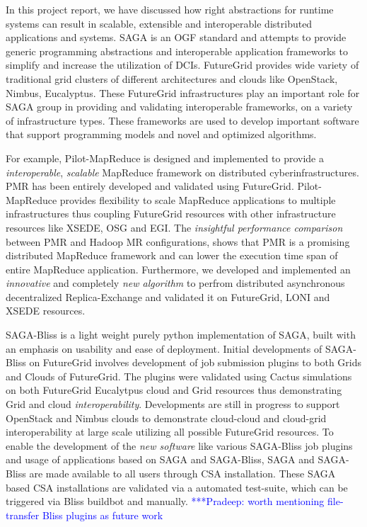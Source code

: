 \documentclass[]{paper}
\newcommand{\pmnote}[1]{ {\textcolor{blue} { ***Pradeep: #1 }}}
\newcommand{\pmnote}[1]{}
\begin{document}
In this project report, we have discussed how right abstractions for runtime systems can result in scalable, extensible and interoperable distributed applications and systems.  SAGA is an OGF standard and attempts to provide generic programming abstractions and interoperable application frameworks to simplify and increase the utilization of DCIs.  FutureGrid provides wide variety of traditional grid clusters of different architectures and clouds like OpenStack, Nimbus, Eucalyptus.  These FutureGrid infrastructures play an important role for SAGA group in providing and validating interoperable frameworks, on a variety of infrastructure types.  These frameworks are used to develop important software that support programming models and novel and optimized algorithms.

For example, Pilot-MapReduce is designed and implemented to provide a \textit{interoperable}, \textit{scalable} MapReduce framework on distributed cyberinfrastructures. PMR has been entirely developed and validated using FutureGrid.  %
Pilot-MapReduce provides flexibility to scale MapReduce applications to multiple infrastructures thus coupling FutureGrid resources with other infrastructure resources like XSEDE, OSG and EGI.  The \textit{insightful performance comparison} between PMR and Hadoop MR configurations, shows that PMR is a promising distributed MapReduce framework and can lower the execution time span of entire MapReduce application.  Furthermore, we developed and implemented an \textit{innovative} and completely \textit{new algorithm} to perfrom distributed asynchronous decentralized Replica-Exchange and validated it on FutureGrid, LONI and XSEDE resources.

SAGA-Bliss is a light weight purely python implementation of SAGA, built with an emphasis on usability and ease of deployment. Initial developments of SAGA-Bliss on FutureGrid involves development of job submission plugins to both Grids and Clouds of FutureGrid. The plugins were validated using Cactus simulations on both FutureGrid Eucalytpus cloud and Grid resources thus demonstrating Grid and cloud \textit{interoperability}. Developments are still in progress to support OpenStack and Nimbus clouds to demonstrate cloud-cloud and cloud-grid interoperability at large scale utilizing all possible FutureGrid resources.  To enable the development of the \textit{new software} like various SAGA-Bliss job plugins and usage of applications based on SAGA and SAGA-Bliss, SAGA and SAGA-Bliss are made available to all users through CSA installation. These SAGA based CSA installations are validated via a automated test-suite, which can be triggered via Bliss buildbot and manually. \pmnote{ worth mentioning file-transfer Bliss plugins as future work}
\end{document}
